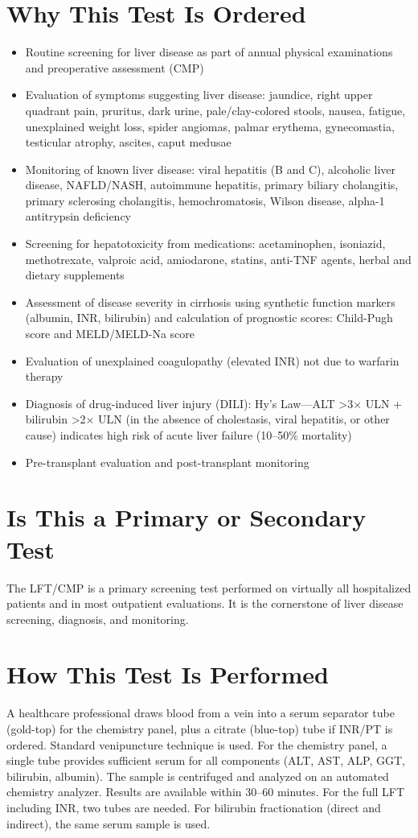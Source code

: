 \section*{Why This Test Is Ordered}
\begin{itemize}
  \item Routine screening for liver disease as part of annual physical examinations and preoperative assessment (CMP)
  \item Evaluation of symptoms suggesting liver disease: jaundice, right upper quadrant pain, pruritus, dark urine, pale/clay-colored stools, nausea, fatigue, unexplained weight loss, spider angiomas, palmar erythema, gynecomastia, testicular atrophy, ascites, caput medusae
  \item Monitoring of known liver disease: viral hepatitis (B and C), alcoholic liver disease, NAFLD/NASH, autoimmune hepatitis, primary biliary cholangitis, primary sclerosing cholangitis, hemochromatosis, Wilson disease, alpha-1 antitrypsin deficiency
  \item Screening for hepatotoxicity from medications: acetaminophen, isoniazid, methotrexate, valproic acid, amiodarone, statins, anti-TNF agents, herbal and dietary supplements
  \item Assessment of disease severity in cirrhosis using synthetic function markers (albumin, INR, bilirubin) and calculation of prognostic scores: Child-Pugh score and MELD/MELD-Na score
  \item Evaluation of unexplained coagulopathy (elevated INR) not due to warfarin therapy
  \item Diagnosis of drug-induced liver injury (DILI): Hy's Law---ALT >3$\times$ ULN + bilirubin >2$\times$ ULN (in the absence of cholestasis, viral hepatitis, or other cause) indicates high risk of acute liver failure (10--50\% mortality)
  \item Pre-transplant evaluation and post-transplant monitoring
\end{itemize}

\section*{Is This a Primary or Secondary Test}
The LFT/CMP is a primary screening test performed on virtually all hospitalized patients and in most outpatient evaluations. It is the cornerstone of liver disease screening, diagnosis, and monitoring.

\section*{How This Test Is Performed}
A healthcare professional draws blood from a vein into a serum separator tube (gold-top) for the chemistry panel, plus a citrate (blue-top) tube if INR/PT is ordered. Standard venipuncture technique is used. For the chemistry panel, a single tube provides sufficient serum for all components (ALT, AST, ALP, GGT, bilirubin, albumin). The sample is centrifuged and analyzed on an automated chemistry analyzer. Results are available within 30--60 minutes. For the full LFT including INR, two tubes are needed. For bilirubin fractionation (direct and indirect), the same serum sample is used.

